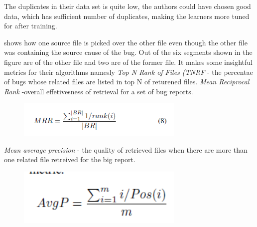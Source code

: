 \documentclass[]{sig-alternate-05-2015}
\begin{document}
The duplicates in their data set is quite low, the authors could have chosen good data, which has sufficient number of duplicates, making the learners more tuned for after training. \newline

 \cite{Wong} shows how one source file is picked over the other file even though the other file was containing the source cause of the bug. Out of the six segments shown in the figure are of the other file and two are of the former file. It makes some insightful metrics for their algorithms namesly \emph{Top N Rank of Files (TNRF} - the percentae of bugs whose related files are listed in top N of returened files. \emph{Mean Reciprocal Rank} -overall effetivesness of retrieval for a set of bug reports.
 \begin{figure}
 \includegraphics[width=8cm]{fig6f1.png}
 \end{figure}
 \emph{Mean average precision} - the quality of retrieved files when there are more than one related file retreived for the big report.
 \begin{figure}
 \includegraphics[width=8cm]{fig6f2.png}
 \end{figure}
 
\end{document}
